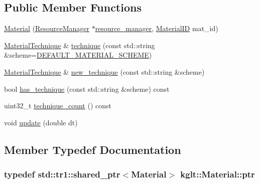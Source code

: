 \subsection*{Public Member Functions}
\begin{DoxyCompactItemize}
\item 
\hyperlink{classkglt_1_1_material_aad778f778c05fc5720f9e3a08f6bbc8c}{Material} (\hyperlink{classkglt_1_1_resource_manager}{Resource\-Manager} $\ast$\hyperlink{classkglt_1_1_resource_a966a14c55828b2adc52aad0fac828205}{resource\-\_\-manager}, \hyperlink{namespacekglt_a5ffac6377a7d3e163b4d5c31f71db43a}{Material\-I\-D} mat\-\_\-id)
\item 
\hyperlink{classkglt_1_1_material_technique}{Material\-Technique} \& \hyperlink{classkglt_1_1_material_ae37ccd2da0bc7e70e0edc936d53b4445}{technique} (const std\-::string \&scheme=\hyperlink{namespacekglt_a38d05dbff502b115008d20ebdfd77a44}{D\-E\-F\-A\-U\-L\-T\-\_\-\-M\-A\-T\-E\-R\-I\-A\-L\-\_\-\-S\-C\-H\-E\-M\-E})
\item 
\hyperlink{classkglt_1_1_material_technique}{Material\-Technique} \& \hyperlink{classkglt_1_1_material_a9af8476d6676b58046cb96650113c3d0}{new\-\_\-technique} (const std\-::string \&scheme)
\item 
bool \hyperlink{classkglt_1_1_material_a2227ac2dd6d18634b794056676287074}{has\-\_\-technique} (const std\-::string \&scheme) const 
\item 
uint32\-\_\-t \hyperlink{classkglt_1_1_material_aef6cac7b7f256907ad62b5d7dfca2557}{technique\-\_\-count} () const 
\item 
void \hyperlink{classkglt_1_1_material_a6270c1511f68885a854d8e49dbc7cfc6}{update} (double dt)
\end{DoxyCompactItemize}


\subsection{Member Typedef Documentation}
\hypertarget{classkglt_1_1_material_a5e4028035299737d4c7881ce813bff58}{
\subsubsection[{ptr}]{\setlength{\rightskip}{0pt plus 5cm}typedef std\-::tr1\-::shared\-\_\-ptr$<${\bf Material}$>$ {\bf kglt\-::\-Material\-::ptr}}}\label{classkglt_1_1_material_a5e4028035299737d4c7881ce813bff58}


